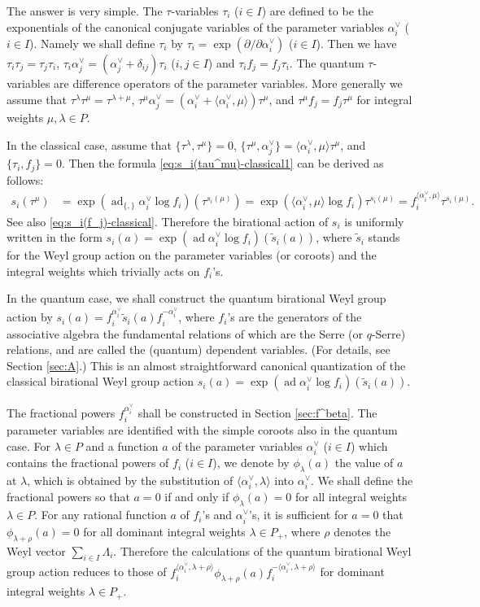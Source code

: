 \documentclass[12pt,twoside]{article}
\newcommand\bra{\langle}
\newcommand\ket{\rangle}
\newcommand\ad{\mathop{\mathrm{ad}}\nolimits}
\newcommand\av{\alpha^\vee}
\newcommand\ts{{\tilde s}}
\renewcommand\d{\partial}
\theoremstyle{plain} %
\theoremstyle{definition} %
\theoremstyle{definition} %
\numberwithin{theorem}{section}
\numberwithin{equation}{section}
\numberwithin{figure}{section}
\numberwithin{table}{section}
\newcommand\secref[1]{Section \ref{#1}}
\begin{document}
The answer is very simple. 
The $\tau$-variables $\tau_i$ ($i\in I$) are defined 
to be the exponentials of the canonical conjugate variables 
of the parameter variables $\av_i$ ($i\in I$).
Namely we shall define $\tau_i$ by $\tau_i = \exp(\d/\d\av_i)$ ($i\in I$). 
Then we have $\tau_i\tau_j=\tau_j\tau_i$, $\tau_i\av_j=(\av_j+\delta_{ij})\tau_i$ ($i,j\in I$)
and $\tau_i f_j = f_j \tau_i$.
The quantum $\tau$-variables are difference operators 
of the parameter variables.
More generally we assume that $\tau^\lambda\tau^\mu=\tau^{\lambda+\mu}$, 
$\tau^\mu\av_j=(\av_i+\bra\av_i,\mu\ket)\tau^\mu$,
and $\tau^\mu f_j=f_j\tau^\mu$
for integral weights $\mu,\lambda\in P$.

In the classical case, 
assume that $\{\tau^\lambda,\tau^\mu\}=0$,
$\{\tau^\mu,\av_j\}=\bra\av_i,\mu\ket\tau^\mu$, and $\{\tau_i,f_j\}=0$.
Then the formula \eqref{eq:s_i(tau^mu)-classical1} can be derived as follows: 
\begin{align}
 s_i(\tau^\mu) 
 &
 = \exp(\ad_{\{,\}} \av_i \log f_i)(\tau^{s_i(\mu)})
 = \exp(\bra\av_i,\mu\ket \log f_i)\tau^{s_i(\mu)}
 = f_i^{\bra\av_i,\mu\ket}\tau^{s_i(\mu)}.
 \label{eq:s_i(tau^mu)-classical2}
\end{align}
See also \eqref{eq:s_i(f_j)-classical}.
Therefore the birational action of $s_i$ is uniformly written in the form 
$s_i(a) = \exp(\ad \av_i\log f_i)(\ts_i(a))$,
where $\ts_i$ stands for the Weyl group action on the parameter variables
(or coroots) and the integral weights which trivially acts on $f_i$'s.

In the quantum case, we shall construct the quantum birational Weyl group action by
$s_i(a)=f_i^{\av_i} \ts_i(a) f_i^{-\av_i}$, 
where $f_i$'s are the generators of 
the associative algebra the fundamental relations of which
are the Serre (or $q$-Serre) relations,
and are called the (quantum) dependent variables.
(For details, see \secref{sec:A}.)
This is an almost straightforward canonical quantization 
of the classical birational Weyl group action $s_i(a) = \exp(\ad \av_i\log f_i)(\ts_i(a))$.

The fractional powers $f_i^{\av_i}$ shall be constructed in \secref{sec:f^beta}.
The parameter variables are identified with the simple coroots also in the quantum case. 
For $\lambda\in P$ and a function $a$ of the parameter variables $\av_i$ ($i\in I$) 
which contains the fractional powers of $f_i$ ($i\in I$), 
we denote by $\phi_\lambda(a)$ the value of $a$ at $\lambda$, 
which is obtained by the substitution of $\bra\av_i,\lambda\ket$ into $\av_i$.
We shall define the fractional powers so that $a=0$ if and only if $\phi_\lambda(a)=0$
for all integral weights $\lambda\in P$.
For any rational function $a$ of $f_i$'s and $\av_i$'s,
it is sufficient for $a=0$ that $\phi_{\lambda+\rho}(a)=0$ 
for all dominant integral weights $\lambda\in P_+$,
where $\rho$ denotes the Weyl vector $\sum_{i\in I}\Lambda_i$.
Therefore the calculations of the quantum birational Weyl group action
reduces to those of 
$f_i^{\bra\av_i,\lambda+\rho\ket} \phi_{\lambda+\rho}(a) f_i^{-\bra\av_i,\lambda+\rho\ket}$ 
for dominant integral weights $\lambda\in P_+$.
\end{document}
